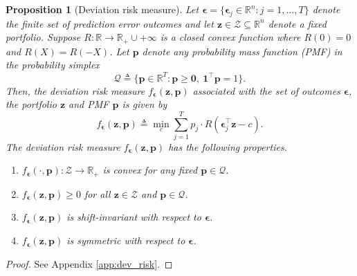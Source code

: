 \documentclass[10pt, twocolumn]{article}
\newtheorem{proposition}[theorem]{Proposition}
\theoremstyle{plain}
\theoremstyle{definition}
\begin{document}
\begin{proposition}[Deviation risk measure]
\label{prop:dev_risk}
Let \(\bm{\epsilon} = \{\bm{\epsilon}_j\in\mathbb{R}^n: j = 1, \ldots, T\}\) 
denote the finite set of prediction error outcomes and let 
\(\bm{z}\in\mathcal{Z} \subseteq \mathbb{R}^n\) denote a fixed portfolio. 
Suppose \(R:\mathbb{R}\rightarrow \mathbb{R}_+\cup +\infty\) is a
closed convex function where \(R(0) = 0\) and \(R(X) = R(-X)\).  Let
\(\bm{p}\) denote any probability mass function (PMF) in the probability
simplex 
\[
  \mathcal{Q}\triangleq \big\{\bm{p} \in\mathbb{R}^T : \bm{p}\geq \bm{0},\
  \bm{1}^\top \bm{p} = 1\big\}. 
\]
Then, the deviation risk measure \(f_{\bm{\epsilon}}(\bm{z}, \bm{p})\)
associated with the set of outcomes 
\(\bm{\epsilon}\), the 
portfolio
\(\bm{z}\) and PMF \(\bm{p}\) is given by  
\begin{equation}
\label{eq:dev_risk} 
f_{\bm{\epsilon}}(\bm{z}, \bm{p}) \triangleq \min_{c} \sum_{j=1}^T
p_j\cdot R(\bm{\epsilon}_j^\top \bm{z} - c). 
\end{equation}
The deviation risk measure \(f_{\bm{\epsilon}}(\bm{z}, \bm{p})\) has the following properties.
\begin{enumerate}[itemsep=-0.15em, topsep=0pt, leftmargin=*]
\item \(f_{\bm{\epsilon}}(\cdot, \bm{p}): \mathcal{Z} \rightarrow \mathbb{R}_+\) is convex for any fixed \(\bm{p}\in\mathcal{Q}\).
  
\item \(f_{\bm{\epsilon}}(\bm{z}, \bm{p})\geq 0\) for all \(\bm{z}\in\mathcal{Z}\) and \(\bm{p}\in\mathcal{Q}\).
   
\item \(f_{\bm{\epsilon}}(\bm{z}, \bm{p})\) is shift-invariant with respect to \(\bm{\epsilon}\).
  
\item \(f_{\bm{\epsilon}}(\bm{z}, \bm{p})\) is symmetric with respect to \(\bm{\epsilon}\).
\end{enumerate}
\end{proposition}
\begin{proof}
  See Appendix \ref{app:dev_risk}.
\end{proof}
\end{document}
